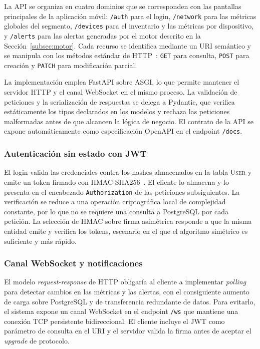 La API se organiza en cuatro dominios que se corresponden con las 
pantallas principales de la aplicación móvil: \texttt{/auth} para 
el login, \texttt{/network} para las métricas globales del 
segmento, \texttt{/devices} para el inventario y las métricas por 
dispositivo, y \texttt{/alerts} para las alertas generadas por el 
motor descrito en la Sección~\ref{subsec:motor}. Cada recurso se 
identifica mediante un URI semántico y se manipula con los métodos 
estándar de HTTP~\cite{rfc9110}: \texttt{GET} para consulta, 
\texttt{POST} para creación y \texttt{PATCH} para modificación 
parcial.

La implementación emplea FastAPI sobre ASGI, lo que permite 
mantener el servidor HTTP y el canal WebSocket en el mismo proceso. 
La validación de peticiones y la serialización de respuestas se 
delega a Pydantic, que verifica estáticamente los tipos declarados 
en los modelos y rechaza las peticiones malformadas antes de que 
alcancen la lógica de negocio. El contrato de la API se expone 
automáticamente como especificación OpenAPI en el endpoint 
\texttt{/docs}.

\subsubsection{Autenticación sin estado con JWT}

El login valida las credenciales contra los hashes almacenados en 
la tabla \textsc{User} y emite un token firmado con HMAC-SHA256~\cite{rfc2104}. 
El cliente lo almacena y lo presenta en el 
encabezado \texttt{Authorization} de las peticiones subsiguientes. 
La verificación se reduce a una operación criptográfica local de 
complejidad constante, por lo que no se requiere una consulta a 
PostgreSQL por cada petición. La selección de HMAC sobre firma 
asimétrica responde a que la misma entidad emite y verifica los 
tokens, escenario en el que el algoritmo simétrico es suficiente y 
más rápido.

\subsubsection{Canal WebSocket y notificaciones}

El modelo \textit{request-response} de HTTP obligaría al cliente a 
implementar \textit{polling} para detectar cambios en las métricas 
y las alertas, con el consiguiente aumento de carga sobre 
PostgreSQL y de transferencia redundante de datos. Para evitarlo, 
el sistema expone un canal WebSocket en el endpoint \texttt{/ws} 
que mantiene una conexión TCP persistente bidireccional. El cliente 
incluye el JWT como parámetro de consulta en el URI y el servidor 
valida la firma antes de aceptar el \textit{upgrade} de protocolo.

